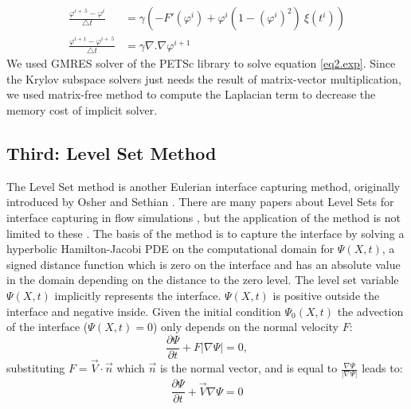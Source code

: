 \documentclass[review]{elsarticle}
\begin{document}
\begin{align}
\frac{\varphi^{i+.5}-\varphi^i}{\bigtriangleup t}&= \gamma (-F'(\varphi^i)+\varphi^i (1-(\varphi^i)^2)\ \xi(t^i)) \label{eq1.exp}\\
\frac{\varphi^{i+1}-\varphi^{i+.5}}{\bigtriangleup t} &= \gamma \nabla .\nabla \varphi^{i+1} \label{eq2.exp}
\end{align}
We used GMRES solver of the PETSc \cite{petsc-user-ref} library to solve equation \eqref{eq2.exp}. Since the Krylov subspace solvers just needs the result of matrix-vector multiplication, we used matrix-free method to compute the Laplacian term to decrease the memory cost of implicit solver.


\subsection{Third: Level Set Method} \label{level set}
The Level Set method is another Eulerian interface capturing method, originally introduced by Osher and Sethian  \cite{Osher1988}. There are many papers about Level Sets for  interface capturing in flow simulations \citep{Kees2011,Losasso2006,Sethian2003}, but the application of the method is not limited to these \citep{Li2011b,Lie2006}.
The basis of the method is to capture the interface by   solving a hyperbolic Hamilton-Jacobi PDE on 
the computational domain for $\varPsi (X,t)$, a signed distance function which  is zero on the interface and has an absolute value in the domain depending on the distance to the zero level.  The level set variable $\varPsi (X,t)$ implicitly represents the interface. 
 $\varPsi (X,t)$ is  positive outside  the interface and  negative inside. 
Given the initial condition $\varPsi_0 (X,t)$ the advection of the interface ($\varPsi (X,t)=0$) only depends on the normal velocity $F$:
\begin{equation}\label{levelseteq1}
        \frac{\partial \varPsi}{\partial t} + F |\nabla \varPsi| = 0,
\end{equation}
substituting $F = \overrightarrow{V} \cdot \overrightarrow{n} $ which  $\overrightarrow{n} $ is the normal vector, and is equal to
$ \frac{\nabla \varPsi}{|\nabla \varPsi|}$ leads to:
\begin{equation}\label{levelseteq2}
        \frac{\partial \varPsi}{\partial t} + \overrightarrow{V} \nabla \varPsi = 0
\end{equation}
\end{document}

